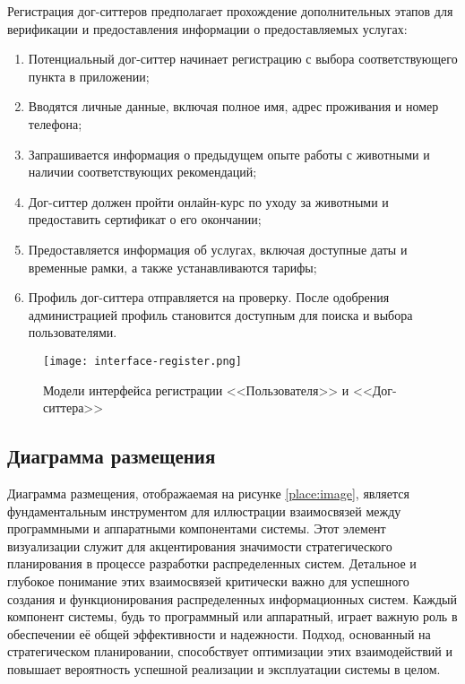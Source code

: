 Регистрация дог-ситтеров предполагает прохождение дополнительных этапов для верификации и предоставления информации о предоставляемых услугах:
\begin{enumerate}
    \item Потенциальный дог-ситтер начинает регистрацию с выбора соответствующего пункта в приложении;
    \item Вводятся личные данные, включая полное имя, адрес проживания и номер телефона;
    \item Запрашивается информация о предыдущем опыте работы с животными и наличии соответствующих рекомендаций;
    \item Дог-ситтер должен пройти онлайн-курс по уходу за животными и предоставить сертификат о его окончании;
    \item Предоставляется информация об услугах, включая доступные даты и временные рамки, а также устанавливаются тарифы;
    \item Профиль дог-ситтера отправляется на проверку. После одобрения администрацией профиль становится доступным для поиска и выбора пользователями.
\end{enumerate}


\begin{figure}[h!]
    \texttt{[image: interface-register.png]}
    \caption{Модели интерфейса регистрации <<Пользователя>> и <<Дог-ситтера>>}
    \label{fig:register}
\end{figure}

\subsection{Диаграмма размещения}

Диаграмма размещения, отображаемая на рисунке \ref{place:image}, является фундаментальным инструментом для иллюстрации взаимосвязей между программными и аппаратными компонентами системы. Этот элемент визуализации служит для акцентирования значимости стратегического планирования в процессе разработки распределенных систем. Детальное и глубокое понимание этих взаимосвязей критически важно для успешного создания и функционирования распределенных информационных систем\cite{makni}. Каждый компонент системы, будь то программный или аппаратный, играет важную роль в обеспечении её общей эффективности и надежности. Подход, основанный на стратегическом планировании, способствует оптимизации этих взаимодействий и повышает вероятность успешной реализации и эксплуатации системы в целом.


